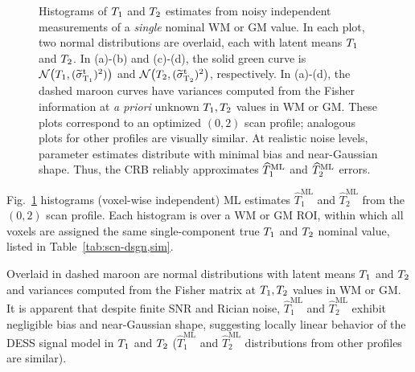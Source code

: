 \begin{figure} [!tbp]
	\centering
	\hspace{1cm}
	\vspace{0.2cm}
	
	\hspace{1cm}
	\caption{
		Histograms of $T_1$ and $T_2$ estimates 
		from noisy independent measurements 
		of a \emph{single} nominal WM or GM value. 
		In each plot, two normal distributions are overlaid, 
		each with latent means $T_1$ and $T_2$. 
		In (a)-(b) and (c)-(d), the solid green curve 
		is $\gauss{\To}{(\sigwot)^2)}$ 
		and $\gauss{\Tt}{(\sigwtt)^2}$, respectively.
		In (a)-(d), the dashed maroon curves have variances computed 
		from the Fisher information at \emph{a priori} unknown $T_1, T_2$ values 
		in WM or GM. 
		These plots correspond to an optimized $(0,2)$ scan profile; 
		analogous plots for other profiles are visually similar. 
		At realistic noise levels,
		parameter estimates distribute 
		with minimal bias and near-Gaussian shape.
		Thus, the CRB reliably approximates 
		$\widehat{T}_1^\mathrm{ML}$ and $\widehat{T}_2^\mathrm{ML}$ errors.
	}
	\label{fig:scn-dsgn,normal}
\end{figure}

Fig.~\ref{fig:scn-dsgn,normal} histograms (voxel-wise independent) ML estimates 
$\widehat{T}_1^{\mathrm{ML}}$ and $\widehat{T}_2^{\mathrm{ML}}$ 
from the $(0,2)$ scan profile.
Each histogram is over a WM or GM ROI, 
within which all voxels are assigned 
the same single-component true $T_1$ and $T_2$ nominal value, 
listed in Table~\ref{tab:scn-dsgn,sim}.

Overlaid in dashed maroon are normal distributions 
with latent means $T_1$ and $T_2$ 
and variances computed 
from the Fisher matrix at $T_1,T_2$ values 
in WM or GM. 
It is apparent that despite finite SNR and Rician noise, 
$\widehat{T}_1^{\mathrm{ML}}$ and $\widehat{T}_2^{\mathrm{ML}}$ 
exhibit negligible bias and near-Gaussian shape, 
suggesting locally linear behavior of the DESS signal model 
in $T_1$ and $T_2$ 
($\widehat{T}_1^{\mathrm{ML}}$ and $\widehat{T}_2^{\mathrm{ML}}$ distributions 
from other profiles are similar). 

